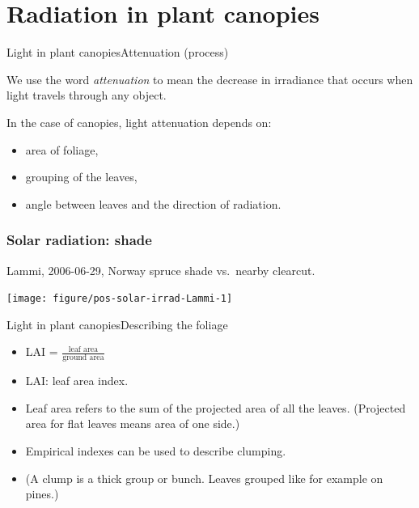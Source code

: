 \documentclass[10pt]{beamer}\usepackage[]{graphicx}\usepackage[]{color}
\newenvironment{knitrout}{}{} %
\begin{document}
\section{Radiation in plant canopies}

\begin{frame}{Light in plant canopies}{Attenuation (process)}

    We use the word \emph{attenuation} to mean the decrease in
    irradiance that occurs when light travels through any object.
    \vspace{0.04\textheight}

    In the case of canopies, light attenuation depends on:\\
    \begin{itemize}
        \item area of foliage,
        \item grouping of the leaves,
        \item angle between leaves and the direction of radiation.
    \end{itemize}
\end{frame}

\begin{frame}
  \frametitle{Solar radiation: shade}

  Lammi, 2006-06-29, Norway spruce shade vs.\ nearby clearcut.

\begin{knitrout}\tiny
{}\color{fgcolor}

{\centering \texttt{[image: figure/pos-solar-irrad-Lammi-1]} 

}


\end{knitrout}
\end{frame}

\begin{frame}{Light in plant canopies}{Describing the foliage}
    \begin{itemize}
        \item LAI = $\frac{\textrm{leaf area}}{\textrm{ground
        area}}$
        \item LAI: leaf area index.
        \item Leaf area refers to the sum of the projected area of
        all the leaves. (Projected area for flat leaves means area of one side.)
        \item Empirical indexes can be used to describe clumping.
        \item (A clump is a thick group or bunch. Leaves grouped
        like for example on pines.)
    \end{itemize}
\end{frame}
\end{document}

